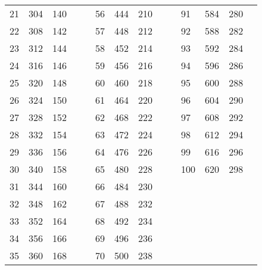 \begin{table}[!h]
\begin{tabular}{|l|l|l|ll|l|l|l|llllll}
		21 & 304 & 140 &  &  & 56 & 444 & 210 &  & \multicolumn{1}{l|}{} & \multicolumn{1}{l|}{91} & \multicolumn{1}{l|}{584} & \multicolumn{1}{l|}{280} &  \\ \cline{1-3} \cline{6-8} \cline{11-13}
		22 & 308 & 142 &  &  & 57 & 448 & 212 &  & \multicolumn{1}{l|}{} & \multicolumn{1}{l|}{92} & \multicolumn{1}{l|}{588} & \multicolumn{1}{l|}{282} &  \\ \cline{1-3} \cline{6-8} \cline{11-13}
		23 & 312 & 144 &  &  & 58 & 452 & 214 &  & \multicolumn{1}{l|}{} & \multicolumn{1}{l|}{93} & \multicolumn{1}{l|}{592} & \multicolumn{1}{l|}{284} &  \\ \cline{1-3} \cline{6-8} \cline{11-13}
		24 & 316 & 146 &  &  & 59 & 456 & 216 &  & \multicolumn{1}{l|}{} & \multicolumn{1}{l|}{94} & \multicolumn{1}{l|}{596} & \multicolumn{1}{l|}{286} &  \\ \cline{1-3} \cline{6-8} \cline{11-13}
		25 & 320 & 148 &  &  & 60 & 460 & 218 &  & \multicolumn{1}{l|}{} & \multicolumn{1}{l|}{95} & \multicolumn{1}{l|}{600} & \multicolumn{1}{l|}{288} &  \\ \cline{1-3} \cline{6-8} \cline{11-13}
		26 & 324 & 150 &  &  & 61 & 464 & 220 &  & \multicolumn{1}{l|}{} & \multicolumn{1}{l|}{96} & \multicolumn{1}{l|}{604} & \multicolumn{1}{l|}{290} &  \\ \cline{1-3} \cline{6-8} \cline{11-13}
		27 & 328 & 152 &  &  & 62 & 468 & 222 &  & \multicolumn{1}{l|}{} & \multicolumn{1}{l|}{97} & \multicolumn{1}{l|}{608} & \multicolumn{1}{l|}{292} &  \\ \cline{1-3} \cline{6-8} \cline{11-13}
		28 & 332 & 154 &  &  & 63 & 472 & 224 &  & \multicolumn{1}{l|}{} & \multicolumn{1}{l|}{98} & \multicolumn{1}{l|}{612} & \multicolumn{1}{l|}{294} &  \\ \cline{1-3} \cline{6-8} \cline{11-13}
		29 & 336 & 156 &  &  & 64 & 476 & 226 &  & \multicolumn{1}{l|}{} & \multicolumn{1}{l|}{99} & \multicolumn{1}{l|}{616} & \multicolumn{1}{l|}{296} &  \\ \cline{1-3} \cline{6-8} \cline{11-13}
		30 & 340 & 158 &  &  & 65 & 480 & 228 &  & \multicolumn{1}{l|}{} & \multicolumn{1}{l|}{100} & \multicolumn{1}{l|}{620} & \multicolumn{1}{l|}{298} &  \\ \cline{1-3} \cline{6-8} \cline{11-13}
		31 & 344 & 160 &  &  & 66 & 484 & 230 &  &  &  &  &  &  \\ \cline{1-3} \cline{6-8}
		32 & 348 & 162 &  &  & 67 & 488 & 232 &  &  &  &  &  &  \\ \cline{1-3} \cline{6-8}
		33 & 352 & 164 &  &  & 68 & 492 & 234 &  &  &  &  &  &  \\ \cline{1-3} \cline{6-8}
		34 & 356 & 166 &  &  & 69 & 496 & 236 &  &  &  &  &  &  \\ \cline{1-3} \cline{6-8}
		35 & 360 & 168 &  &  & 70 & 500 & 238 &  &  &  &  &  &  \\ \cline{1-3} \cline{6-8}
	\end{tabular}
\end{table}
\clearpage

